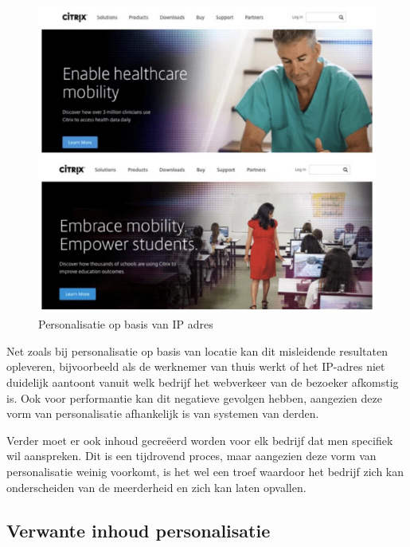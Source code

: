\begin{figure} [hbt!]
	\centering
		\includegraphics[width=\linewidth]{img/IP-based-personalization}
\caption[Personalisatie op basis van IP adres]{ Personalisatie op basis van IP adres}
	\label{fig:IPBasedPersonalization}
\end{figure}


Net zoals bij personalisatie op basis van locatie kan dit misleidende resultaten opleveren, bijvoorbeeld als de werknemer van thuis werkt of het IP-adres niet duidelijk aantoont vanuit welk bedrijf het webverkeer van de bezoeker afkomstig is. Ook voor performantie kan dit negatieve gevolgen hebben, aangezien deze vorm van personalisatie afhankelijk is van systemen van derden. 

Verder moet er ook inhoud gecreëerd worden voor elk bedrijf dat men specifiek wil aanspreken. Dit is een tijdrovend proces, maar aangezien deze vorm van personalisatie weinig voorkomt, is het wel een troef waardoor het bedrijf zich kan onderscheiden van de meerderheid en zich kan laten opvallen.

  
 \subsection{Verwante inhoud personalisatie}
 \label{subsec:Verwante inhoud personalisatie}
 
